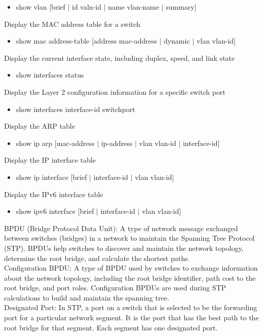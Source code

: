 \documentclass{article}
\begin{document}
\begin{itemize}
\item show vlan [{brief $|$ id valn-id $|$ name vlan-name $|$ summary}]
\end{itemize}
Display the MAC address table for a switch
\begin{itemize}
\item show mac address-table [address mac-address $|$ dynamic $|$ vlan vlan-id]
\end{itemize}
Display the current interface state, including duplex, speed, and link state
\begin{itemize}
\item show interfaces status
\end{itemize}
Display the Layer 2 configuration information for a specific switch port
\begin{itemize}
\item show interfaces interface-id switchport
\end{itemize}
Display the ARP table
\begin{itemize}
\item show ip arp [mac-address $|$ ip-address $|$ vlan vlan-id $|$ interface-id]
\end{itemize}
Display the IP interface table
\begin{itemize}
\item show ip interface [brief $|$ interface-id $|$ vlan vlan-id]
\end{itemize}
Display the IPv6 interface table
\begin{itemize}
\item show ipv6 interface [brief $|$ interface-id $|$ vlan vlan-id]
\end{itemize}

BPDU (Bridge Protocol Data Unit): A type of network message exchanged between switches (bridges) in a network to maintain the Spanning Tree Protocol (STP). BPDUs help switches to discover and maintain the network topology, determine the root bridge, and calculate the shortest paths.\\

Configuration BPDU: A type of BPDU used by switches to exchange information about the network topology, including the root bridge identifier, path cost to the root bridge, and port roles. Configuration BPDUs are used during STP calculations to build and maintain the spanning tree.\\

Designated Port: In STP, a port on a switch that is selected to be the forwarding port for a particular network segment. It is the port that has the best path to the root bridge for that segment. Each segment has one designated port.\\
\end{document}
